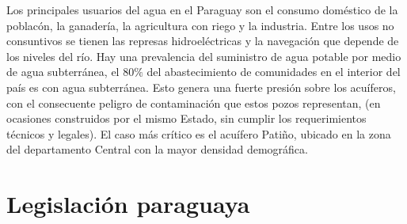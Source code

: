 Los principales usuarios del agua en el Paraguay son el consumo dom\'estico de la poblac\'on, la ganader\'ia, la agricultura con riego y la industria. Entre los usos no consuntivos se tienen las represas hidroel\'ectricas y la navegaci\'on que depende de los niveles del r\'io.\cite{groundwater_caracteristicas_2021}
Hay una prevalencia del suministro de agua potable por medio de agua subterr\'anea, el 80$\%$ del abastecimiento de comunidades en el interior del pa\'is es con agua subterr\'anea. Esto genera una fuerte presi\'on sobre los acu\'iferos, con el consecuente peligro de contaminaci\'on que estos pozos representan, (en ocasiones construidos por el mismo Estado, sin cumplir los requerimientos t\'ecnicos y legales). El caso m\'as cr\'itico es el acu\'ifero Pati\~no, ubicado en la zona del departamento
Central con la mayor densidad demogr\'afica.\cite{alvarez-2014}


\section{Legislaci\'on paraguaya}

